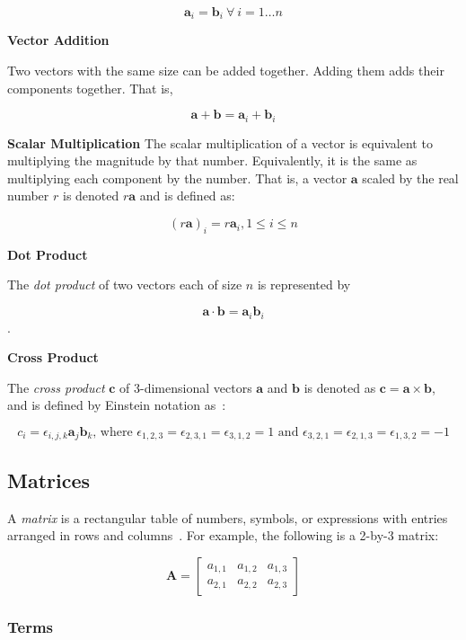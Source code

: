 \documentclass[12pt]{article}
\begin{document}
$$\mathbf{a}_i = \mathbf{b}_i\ \forall~i = 1\ldots n$$

\noindent\textbf{Vector Addition}

\noindent Two vectors with the same size can be added together. Adding them adds their
components together. That is,

$$\mathbf{a} + \mathbf{b} = \mathbf{a}_i + \mathbf{b}_i$$

\noindent\textbf{Scalar Multiplication}
The scalar multiplication of a vector is equivalent to multiplying the magnitude
by that number. Equivalently, it is the same as multiplying each component by the
number. That is, a vector $\mathbf{a}$ scaled by the real number $r$ is denoted
$r\mathbf{a}$ and is defined as:

$$(r\mathbf{a})_i = r\mathbf{a}_i, 1 \leq i \leq n$$

\noindent \textbf{Dot Product}

The \textit{dot product} of two vectors each of size $n$ is represented by

$$\mathbf{a} \cdot \mathbf{b} = \mathbf{a}_i\mathbf{b}_i$$.

\noindent \textbf{Cross Product}

The \textit{cross product} $\mathbf{c}$ of 3-dimensional vectors $\mathbf{a}$ and
$\mathbf{b}$ is denoted as $\mathbf{c} = \mathbf{a} \times 
\mathbf{b}$, and is defined by Einstein notation as~\citep{ContinuumMechanics2012}:

$$c_i = \epsilon_{i,j,k}\mathbf{a}_j\mathbf{b}_k\text{, where }\epsilon_{1,2,3}=
\epsilon_{2,3,1}=\epsilon_{3,1,2} = 1\text{ and }\epsilon_{3,2,1} = \epsilon_{2,1,3}
= \epsilon_{1,3,2} = -1$$


\subsection{Matrices}
A \textit{matrix} is a rectangular table of numbers, symbols, or expressions
with entries arranged in rows and columns~\citep{Wikipedia_Matrix_2025}. For
example, the following is a 2-by-3 matrix: 

$$\mathbf{A} = 
\begin{bmatrix}
  a_{1,1} & a_{1,2} & a_{1,3} \\
  a_{2,1} & a_{2,2} & a_{2,3}
 \end{bmatrix}$$

\subsubsection{Terms}
\end{document}

